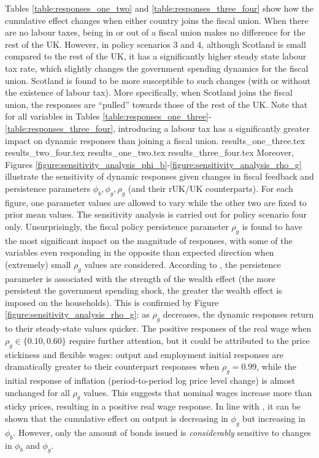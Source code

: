 Tables \ref{table:responses_one_two} and \ref{table:responses_three_four} show how the cumulative effect changes when either country joins the fiscal union. When there are no labour taxes, being in or out of a fiscal union makes no difference for the rest of the UK. However, in policy scenarios 3 and 4, although Scotland is small compared to the rest of the UK, it has a significantly higher steady state labour tax rate, which slightly changes the government spending dynamics for the fiscal union. Scotland is found to be more susceptible to such changes (with or without the existence of labour tax). More specifically, when Scotland joins the fiscal union, the responses are ``pulled'' towards those of the rest of the UK. Note that for all variables in Tables \ref{table:responses_one_three}-\ref{table:responses_three_four}, introducing a labour tax has a significantly greater impact on dynamic responses than joining a fiscal union.
{results_one_three.tex}
{results_two_four.tex}
\newpage
{results_one_two.tex}
{results_three_four.tex}
Moreover, Figures \ref{figure:sensitivity_analysis_phi_b}-\ref{figure:sensitivity_analysis_rho_g} illustrate the sensitivity of dynamic responses given changes in fiscal feedback and persistence parameters $\phi_b, \phi_g, \rho_g$ (and their rUK/UK counterparts). For each figure, one parameter values are allowed to vary while the other two are fixed to prior mean values. The sensitivity analysis is carried out for policy scenario four only. Unsurprisingly, the fiscal policy persistence parameter $\rho_g$ is found to have the most significant impact on the magnitude of responses, with some of the variables even responding in the opposite than expected direction when (extremely) small $\rho_g$ values are considered. According to \textcite[27]{jordigal_2005_understanding}, the persistence parameter is associated with the strength of the wealth effect (the more persistent the government spending shock, the greater the wealth effect is imposed on the households). This is confirmed by Figure \ref{figure:sensitivity_analysis_rho_g}: as $\rho_g$ decreases, the dynamic responses return to their steady-state values quicker. The positive responses of the real wage when $\rho_g \in \{ 0.10, 0.60 \}$ require further attention, but it could be attributed to the price stickiness and flexible wages: output and employment initial responses are dramatically greater to their counterpart responses when $\rho_g = 0.99$, while the initial response of inflation (period-to-period log price level change) is almost unchanged for all $\rho_g$ values. This suggests that nominal wages increase more than sticky prices, resulting in a positive real wage response. In line with \citereset\textcite[52]{jordigal_2005_understanding}, it can be shown that the cumulative effect on output is decreasing in $\phi_g$ but increasing in $\phi_b$. However, only the amount of bonds issued is \textit{considerably} sensitive to changes in $\phi_b$ and $\phi_g$.
